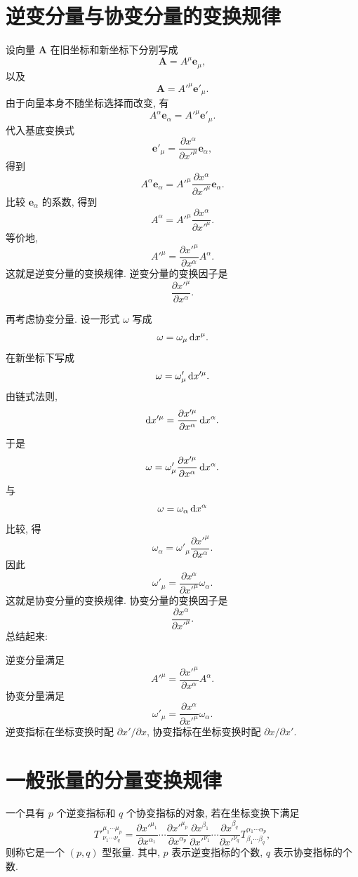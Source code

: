 \section{逆变分量与协变分量的变换规律}

设向量 $\bm{A}$ 在旧坐标和新坐标下分别写成
\[
\bm{A}=A^\mu\bm{e}_\mu,
\]
以及
\[
\bm{A}=A'^\mu\bm{e}'_\mu.
\]
由于向量本身不随坐标选择而改变, 有
\[
A^\alpha\bm{e}_\alpha
=
A'^\mu\bm{e}'_\mu.
\]
代入基底变换式
\[
\bm{e}'_\mu
=
\frac{\partial x^\alpha}{\partial x'^\mu}
\bm{e}_\alpha,
\]
得到
\[
A^\alpha\bm{e}_\alpha
=
A'^\mu
\frac{\partial x^\alpha}{\partial x'^\mu}
\bm{e}_\alpha.
\]
比较 $\bm{e}_\alpha$ 的系数, 得到
\[
A^\alpha
=
A'^\mu
\frac{\partial x^\alpha}{\partial x'^\mu}.
\]
等价地, 
\[
A'^\mu
=
\frac{\partial x'^\mu}{\partial x^\alpha}A^\alpha.
\]
这就是逆变分量的变换规律. 逆变分量的变换因子是
\[
\frac{\partial x'^\mu}{\partial x^\alpha}.
\]

再考虑协变分量. 设一形式 $\omega$ 写成
\[
\omega=\omega_\mu \mathop{}\!\mathrm{d} x^\mu.
\]
在新坐标下写成
\[
\omega=\omega'_\mu \mathop{}\!\mathrm{d} x'^\mu.
\]
由链式法则, 
\[
\mathop{}\!\mathrm{d} x'^\mu
=
\frac{\partial x'^\mu}{\partial x^\alpha}\mathop{}\!\mathrm{d} x^\alpha.
\]
于是
\[
\omega
=
\omega'_\mu
\frac{\partial x'^\mu}{\partial x^\alpha}
\mathop{}\!\mathrm{d} x^\alpha.
\]
与
\[
\omega=\omega_\alpha \mathop{}\!\mathrm{d} x^\alpha
\]
比较, 得
\[
\omega_\alpha
=
\omega'_\mu
\frac{\partial x'^\mu}{\partial x^\alpha}.
\]
因此
\[
\omega'_\mu
=
\frac{\partial x^\alpha}{\partial x'^\mu}\omega_\alpha.
\]
这就是协变分量的变换规律. 协变分量的变换因子是
\[
\frac{\partial x^\alpha}{\partial x'^\mu}.
\]
总结起来: 

逆变分量满足
\[
A'^\mu
=
\frac{\partial x'^\mu}{\partial x^\alpha}A^\alpha.
\]
协变分量满足
\[
\omega'_\mu
=
\frac{\partial x^\alpha}{\partial x'^\mu}\omega_\alpha.
\]
逆变指标在坐标变换时配 $\partial x'/\partial x$, 协变指标在坐标变换时配 $\partial x/\partial x'$. 

\section{一般张量的分量变换规律}

一个具有 $p$ 个逆变指标和 $q$ 个协变指标的对象, 若在坐标变换下满足
\[
T'^{\mu_1\cdots\mu_p}_{\nu_1\cdots\nu_q}
=
\frac{\partial x'^{\mu_1}}{\partial x^{\alpha_1}}
\cdots
\frac{\partial x'^{\mu_p}}{\partial x^{\alpha_p}}
\frac{\partial x^{\beta_1}}{\partial x'^{\nu_1}}
\cdots
\frac{\partial x^{\beta_q}}{\partial x'^{\nu_q}}
T^{\alpha_1\cdots\alpha_p}_{\beta_1\cdots\beta_q},
\]
则称它是一个 $(p,q)$ 型张量. 其中, $p$ 表示逆变指标的个数, $q$ 表示协变指标的个数. 

